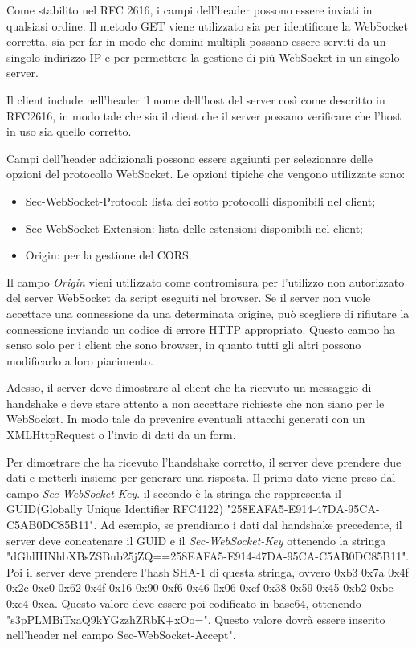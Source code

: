 Come stabilito nel RFC 2616, i campi dell'header possono essere inviati in qualsiasi ordine.  
Il metodo GET viene utilizzato sia per identificare la WebSocket corretta, sia per far in modo che domini multipli possano essere serviti da un singolo indirizzo IP e per permettere la gestione di più WebSocket in un singolo server.

Il client include nell'header il nome dell'host del server così come descritto in RFC2616\cite{RFC2616}, in modo tale che sia il client che il server
possano verificare che l'host in uso sia quello corretto.

Campi dell'header addizionali possono essere aggiunti  per selezionare
delle opzioni del protocollo WebSocket.
Le opzioni tipiche che vengono utilizzate sono:
\begin{itemize}
\item Sec-WebSocket-Protocol: lista dei sotto protocolli disponibili nel client;
\item Sec-WebSocket-Extension: lista delle estensioni disponibili nel client;
\item Origin: per la gestione del CORS.
\end{itemize}

Il campo \emph{Origin} vieni utilizzato come contromisura per 
l'utilizzo non autorizzato del server WebSocket da script eseguiti nel browser.
Se il server non vuole accettare una connessione da una determinata origine, 
può scegliere di rifiutare la connessione inviando un codice di errore HTTP appropriato.
Questo campo ha senso solo per i client che sono browser, in quanto tutti gli altri possono modificarlo a loro piacimento.

Adesso, il server deve dimostrare al client che ha ricevuto un messaggio di handshake e deve stare attento a non accettare richieste che non siano per le WebSocket.
In modo tale da prevenire eventuali attacchi generati con un XMLHttpRequest o l'invio di dati da un form.

Per dimostrare che ha ricevuto l'handshake corretto, il server deve prendere due dati e metterli insieme per generare una risposta.
Il primo dato viene preso dal campo \emph{Sec-WebSocket-Key}.
il secondo è la stringa che rappresenta il GUID(Globally Unique Identifier RFC4122\cite{RFC4122}) "258EAFA5-E914-47DA-95CA-C5AB0DC85B11".
Ad esempio, se prendiamo i dati dal handshake precedente, 
il server deve concatenare il GUID e il \emph{Sec-WebSocket-Key} ottenendo la stringa "dGhlIHNhbXBsZSBub25jZQ==258EAFA5-E914-47DA-95CA-C5AB0DC85B11".
Poi il server deve prendere l'hash SHA-1 di questa stringa, ovvero 
0xb3 0x7a 0x4f 0x2c 0xc0 0x62 0x4f 0x16 0x90 0xf6 0x46 0x06 0xcf 0x38 0x59 0x45 0xb2 0xbe 0xc4 0xea.
Questo valore deve essere poi codificato in base64, 
ottenendo "s3pPLMBiTxaQ9kYGzzhZRbK+xOo=".
Questo valore dovrà essere inserito nell'header nel campo Sec-WebSocket-Accept".

